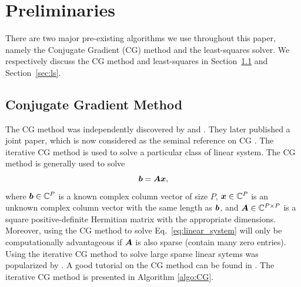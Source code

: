 \documentclass[useAMS,usenatbib]{mn2e}
\newcommand{\bA}{\bmath{A}}
\newcommand{\bb}{\bmath{b}}
\newcommand{\bx}{\bmath{x}}
\begin{document}
%  
 
\section{Preliminaries}
\label{sec:preliminaries}
There are two major pre-existing algorithms we use throughout this paper, namely the Conjugate Gradient (CG) method and the least-squares solver.
We respectively discuss the CG method and least-squares in Section~\ref{sec:conj_grad} and Section~\ref{sec:ls}.

\subsection{Conjugate Gradient Method}
\label{sec:conj_grad}
The CG method was independently discovered by \citet{Hestenes1973} and \citet{Stiefel1952}. They later published a joint paper, which is now considered as the seminal
reference on CG \citep{Hestenes1952}. The iterative CG method is used to solve a particular class of linear system. The CG method is generally used to solve
\begin{equation}
\label{eq:linear_system}
\bb = \bA\bx,
\end{equation}
where $\bb\in\mathbb{C}^P$ is a known complex column vector of size $P$, $\bx\in\mathbb{C}^P$ is an unknown complex column vector with the same length as $\bb$, and $\bA\in\mathbb{C}^{P\times P}$ is a square positive-definite Hermitian matrix with the appropriate dimensions.  
Moreover, using the CG method to solve Eq.~\eqref{eq:linear_system} will only be computationally advantageous if $\bA$ is also sparse (contain many zero entries).
Using the iterative CG method to solve large sparse linear sytems was popularized by \citet{Reid1971}. A good tutorial on the CG method can be found in \citep{Shewchuk1994}.
The iterative CG method is presented in Algorithm \ref{algo:CG}. 
\end{document}
